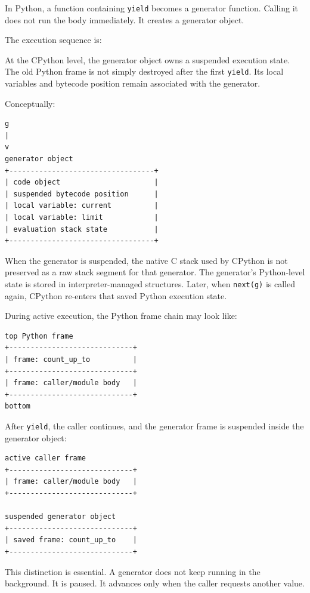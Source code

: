 In Python, a function containing \texttt{yield} becomes a generator function. Calling it does not run the body immediately. It creates a generator object.

The execution sequence is:

At the CPython level, the generator object owns a suspended execution state. The old Python frame is not simply destroyed after the first \texttt{yield}. Its local variables and bytecode position remain associated with the generator.

Conceptually:

\begin{verbatim}
g
|
v
generator object
+----------------------------------+
| code object                      |
| suspended bytecode position      |
| local variable: current          |
| local variable: limit            |
| evaluation stack state           |
+----------------------------------+
\end{verbatim}

When the generator is suspended, the native C stack used by CPython is not preserved as a raw stack segment for that generator. The generator's Python-level state is stored in interpreter-managed structures. Later, when \texttt{next(g)} is called again, CPython re-enters that saved Python execution state.

During active execution, the Python frame chain may look like:

\begin{verbatim}
top Python frame
+-----------------------------+
| frame: count_up_to          |
+-----------------------------+
| frame: caller/module body   |
+-----------------------------+
bottom
\end{verbatim}

After \texttt{yield}, the caller continues, and the generator frame is suspended inside the generator object:

\begin{verbatim}
active caller frame
+-----------------------------+
| frame: caller/module body   |
+-----------------------------+

suspended generator object
+-----------------------------+
| saved frame: count_up_to    |
+-----------------------------+
\end{verbatim}

This distinction is essential. A generator does not keep running in the background. It is paused. It advances only when the caller requests another value.

